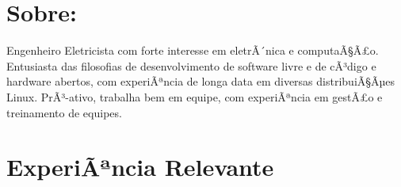 \documentclass[a4paper]{twentysecondcv} %
\begin{document}
\makeprofile %
 
\section{Sobre: }
\small{Engenheiro Eletricista com forte interesse em eletrÃ´nica e computaÃ§Ã£o. Entusiasta das filosofias de desenvolvimento de software livre e de cÃ³digo e hardware abertos, com experiÃªncia de longa data em diversas distribuiÃ§Ãµes Linux. PrÃ³-ativo, trabalha bem em equipe, com experiÃªncia em gestÃ£o e treinamento de equipes.}

\section{ExperiÃªncia Relevante}
\end{document}
